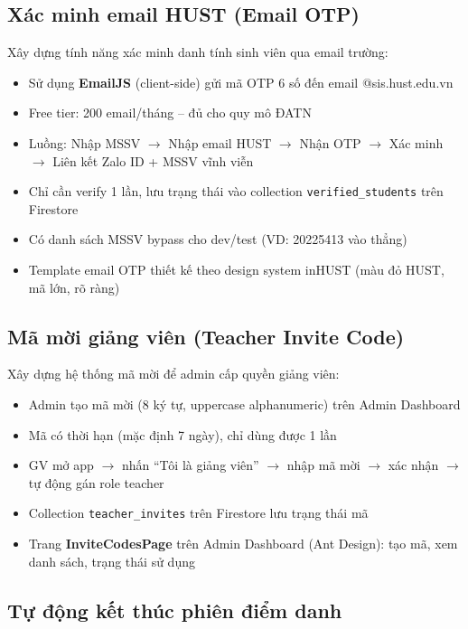 \documentclass{article}
\begin{document}
\subsection{Xác minh email HUST (Email OTP)}

Xây dựng tính năng xác minh danh tính sinh viên qua email trường:

\begin{itemize}[leftmargin=1.5em]
  \item Sử dụng \textbf{EmailJS} (client-side) gửi mã OTP 6 số đến email @sis.hust.edu.vn
  \item Free tier: 200 email/tháng -- đủ cho quy mô ĐATN
  \item Luồng: Nhập MSSV $\rightarrow$ Nhập email HUST $\rightarrow$ Nhận OTP $\rightarrow$ Xác minh $\rightarrow$ Liên kết Zalo ID + MSSV vĩnh viễn
  \item Chỉ cần verify 1 lần, lưu trạng thái vào collection \texttt{verified\_students} trên Firestore
  \item Có danh sách MSSV bypass cho dev/test (VD: 20225413 vào thẳng)
  \item Template email OTP thiết kế theo design system inHUST (màu đỏ HUST, mã lớn, rõ ràng)
\end{itemize}

\subsection{Mã mời giảng viên (Teacher Invite Code)}

Xây dựng hệ thống mã mời để admin cấp quyền giảng viên:

\begin{itemize}[leftmargin=1.5em]
  \item Admin tạo mã mời (8 ký tự, uppercase alphanumeric) trên Admin Dashboard
  \item Mã có thời hạn (mặc định 7 ngày), chỉ dùng được 1 lần
  \item GV mở app $\rightarrow$ nhấn ``Tôi là giảng viên'' $\rightarrow$ nhập mã mời $\rightarrow$ xác nhận $\rightarrow$ tự động gán role teacher
  \item Collection \texttt{teacher\_invites} trên Firestore lưu trạng thái mã
  \item Trang \textbf{InviteCodesPage} trên Admin Dashboard (Ant Design): tạo mã, xem danh sách, trạng thái sử dụng
\end{itemize}

\subsection{Tự động kết thúc phiên điểm danh}
\end{document}
